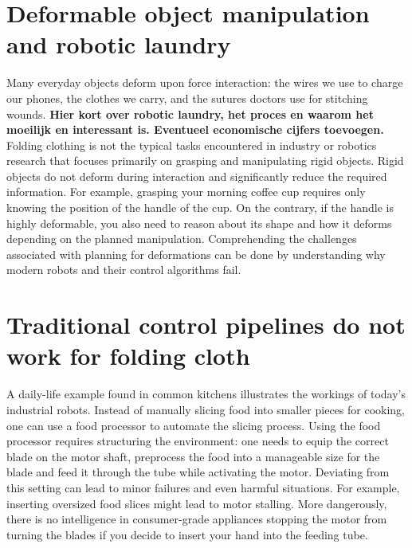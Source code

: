 \documentclass[\home/main.tex]{subfiles}
\begin{document}

\section{Deformable object manipulation and robotic laundry}
Many everyday objects deform upon force interaction: the wires we use to charge our phones, the clothes we carry, and the sutures doctors use for stitching wounds.
\textbf{Hier kort over robotic laundry, het proces en waarom het moeilijk en interessant is. Eventueel economische cijfers toevoegen.}
Folding clothing is not the typical tasks encountered in industry or robotics research that focuses primarily on grasping and manipulating rigid objects. Rigid objects do not deform during interaction and significantly reduce the required information. For example, grasping your morning coffee cup requires only knowing the position of the handle of the cup.
On the contrary, if the handle is highly deformable, you also need to reason about its shape and how it deforms depending on the planned manipulation.
Comprehending the challenges associated with planning for deformations can be done by understanding why modern robots and their control algorithms fail.

\section{Traditional control pipelines do not work for folding cloth}
A daily-life example found in common kitchens illustrates the workings of today's industrial robots. Instead of manually slicing food into smaller pieces for cooking, one can use a food processor to automate the slicing process.
Using the food processor requires structuring the environment: one needs to equip the correct blade on the motor shaft, preprocess the food into a manageable size for the blade and feed it through the tube while activating the motor. Deviating from this setting can lead to minor failures and even harmful situations. For example, inserting oversized food slices might lead to motor stalling. More dangerously, there is no intelligence in consumer-grade appliances stopping the motor from turning the blades if you decide to insert your hand into the feeding tube.
\end{document}
